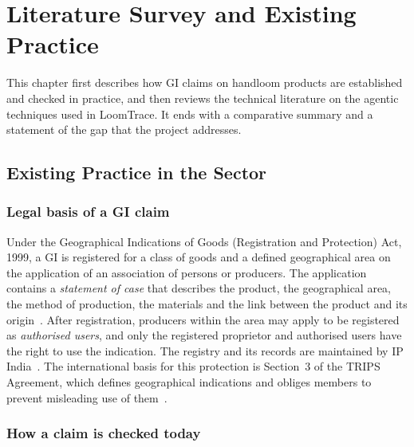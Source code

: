 \chapter{Literature Survey and Existing Practice}

This chapter first describes how GI claims on handloom products are established and checked in
practice, and then reviews the technical literature on the agentic techniques used in LoomTrace. It
ends with a comparative summary and a statement of the gap that the project addresses.

\section{Existing Practice in the Sector}

\subsection{Legal basis of a GI claim}

Under the Geographical Indications of Goods (Registration and Protection) Act, 1999, a GI is
registered for a class of goods and a defined geographical area on the application of an association
of persons or producers. The application contains a \emph{statement of case} that describes the
product, the geographical area, the method of production, the materials and the link between the
product and its origin~\cite{giact1999}. After registration, producers within the area may apply to
be registered as \emph{authorised users}, and only the registered proprietor and authorised users have
the right to use the indication. The registry and its records are maintained by IP India~\cite{ipindia}.
The international basis for this protection is Section~3 of the TRIPS Agreement, which defines
geographical indications and obliges members to prevent misleading use of them~\cite{trips}.

\subsection{How a claim is checked today}

